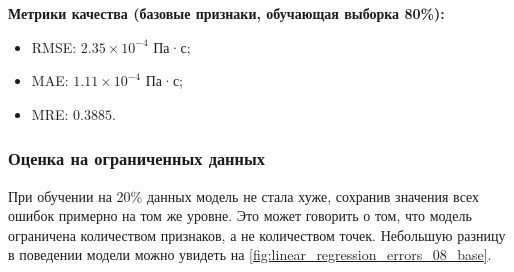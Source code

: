 \documentclass[a4paper,12pt]{article}
\begin{document}
    \begin{minipage}{\textwidth}
      \textbf{Метрики качества (базовые признаки, обучающая выборка 80\%):}
      \begin{itemize}
          \item RMSE: \( 2.35 \times 10^{-4} \) Па·с;
          \item MAE: \( 1.11 \times 10^{-4} \) Па·с;
          \item MRE: \( 0.3885 \).
      \end{itemize}
    \end{minipage}
    
    \subsubsection{Оценка на ограниченных данных}
    
    При обучении на 20\% данных модель не стала хуже, сохранив значения всех ошибок примерно на том же уровне. Это может говорить о том, что модель ограничена количеством признаков, а не количеством точек. Небольшую разницу в поведении модели можно увидеть на \autoref{fig:linear_regression_errors_08_base}.
    
\end{document}
